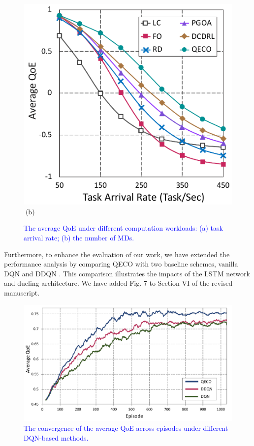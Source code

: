 \documentclass[12pt,draftclsnofoot,onecolumn]{IEEEtran}
\begin{document}
\begin{enumerate}
\begin{figure}[H]
\begin{minipage}[b]{0.3\linewidth}
		\includegraphics[width=\textwidth]{ qoe_1}
		\textcolor{white}{i}\hspace{0.6cm}(b)
	\end{minipage}

	\caption{\textcolor{blue}{The average QoE under different computation workloads: (a) task arrival rate; (b) the number of MDs.}}
	\label{chart444}
\end{figure} 

Furthermore, to enhance the evaluation of our work, we have extended the performance analysis by comparing QECO with two baseline schemes, vanilla DQN and DDQN \cite{van2016deep}. This comparison illustrates the impacts of the LSTM network and dueling architecture. We have added Fig. 7 to Section VI of the revised manuscript.

\begin{figure}[H]
	\captionsetup{name=Fig.}
	\centering
	\includegraphics[width=.6\linewidth]{m1}
	\vspace*{-3mm}
	\caption{\textcolor{blue}{The convergence of the average QoE across episodes under different DQN-based methods.}}
	\vspace*{-3mm}
	\label{chartC0}
\end{figure}


\end{enumerate}
\end{document}
